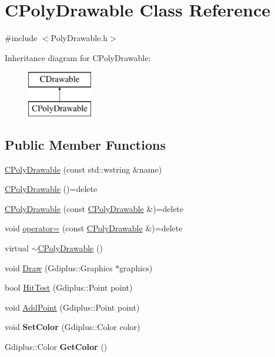 \hypertarget{class_c_poly_drawable}{}\section{C\+Poly\+Drawable Class Reference}
\label{class_c_poly_drawable}


{\ttfamily \#include $<$Poly\+Drawable.\+h$>$}

Inheritance diagram for C\+Poly\+Drawable\+:\begin{figure}[H]
\begin{center}
\leavevmode
\includegraphics[height=2.000000cm]{class_c_poly_drawable}
\end{center}
\end{figure}
\subsection*{Public Member Functions}
\begin{DoxyCompactItemize}
\item 
\hyperlink{class_c_poly_drawable_a0afc2421a1a15fa7065423ccbe6d6ecc}{C\+Poly\+Drawable} (const std\+::wstring \&name)
\item 
\hyperlink{class_c_poly_drawable_ae4265afa898200aa70a943cdea3f8123}{C\+Poly\+Drawable} ()=delete
\item 
\hyperlink{class_c_poly_drawable_abfdd10484ab2cb6ea99c01849cad4082}{C\+Poly\+Drawable} (const \hyperlink{class_c_poly_drawable}{C\+Poly\+Drawable} \&)=delete
\item 
void \hyperlink{class_c_poly_drawable_a86a6c65081b7feb556e5563b36a6ac8a}{operator=} (const \hyperlink{class_c_poly_drawable}{C\+Poly\+Drawable} \&)=delete
\item 
virtual \hyperlink{class_c_poly_drawable_afc766fdf8f37312434063b3b615f410b}{$\sim$\+C\+Poly\+Drawable} ()
\item 
void \hyperlink{class_c_poly_drawable_a30d59469ee2db1cd0bf786ffff031bdf}{Draw} (Gdiplus\+::\+Graphics $\ast$graphics)
\item 
bool \hyperlink{class_c_poly_drawable_a0e1b85469707db9af8f129e52cb1ab64}{Hit\+Test} (Gdiplus\+::\+Point point)
\item 
void \hyperlink{class_c_poly_drawable_a500a475002f4be3cfe6ed865aea0a827}{Add\+Point} (Gdiplus\+::\+Point point)
\item 
\hypertarget{class_c_poly_drawable_a5d57281021db882ae059152f6f304aa0}{}void {\bfseries Set\+Color} (Gdiplus\+::\+Color color)\label{class_c_poly_drawable_a5d57281021db882ae059152f6f304aa0}

\item 
\hypertarget{class_c_poly_drawable_ab14b6cfd0e8c3ae025daa43465a1811f}{}Gdiplus\+::\+Color {\bfseries Get\+Color} ()\label{class_c_poly_drawable_ab14b6cfd0e8c3ae025daa43465a1811f}

\end{DoxyCompactItemize}
